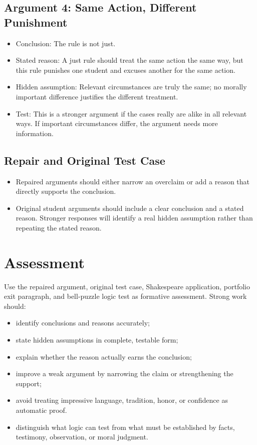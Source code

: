 \documentclass[12pt]{article}
\begin{document}
\subsection*{Argument 4: Same Action, Different Punishment}
\begin{itemize}[leftmargin=*]
\item Conclusion: The rule is not just.
\item Stated reason: A just rule should treat the same action the same way, but this rule punishes one student and excuses another for the same action.
\item Hidden assumption: Relevant circumstances are truly the same; no morally important difference justifies the different treatment.
\item Test: This is a stronger argument if the cases really are alike in all relevant ways. If important circumstances differ, the argument needs more information.
\end{itemize}

\subsection*{Repair and Original Test Case}
\begin{itemize}[leftmargin=*]
\item Repaired arguments should either narrow an overclaim or add a reason that directly supports the conclusion.
\item Original student arguments should include a clear conclusion and a stated reason. Stronger responses will identify a real hidden assumption rather than repeating the stated reason.
\end{itemize}

\section*{Assessment}
Use the repaired argument, original test case, Shakespeare application, portfolio exit paragraph, and bell-puzzle logic test as formative assessment. Strong work should:
\begin{itemize}[leftmargin=*]
\item identify conclusions and reasons accurately;
\item state hidden assumptions in complete, testable form;
\item explain whether the reason actually earns the conclusion;
\item improve a weak argument by narrowing the claim or strengthening the support;
\item avoid treating impressive language, tradition, honor, or confidence as automatic proof.
\item distinguish what logic can test from what must be established by facts, testimony, observation, or moral judgment.
\end{itemize}
\end{document}
